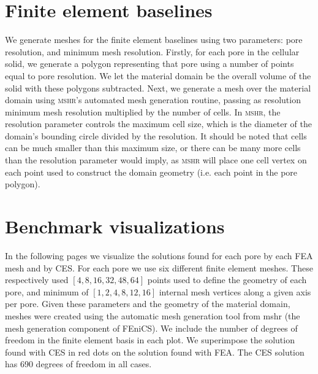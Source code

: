 \section{Finite element baselines}
We generate meshes for the finite element baselines using two parameters: pore resolution, and minimum mesh resolution.
Firstly, for each pore in the cellular solid, we generate a polygon representing that pore using a number of points equal to pore resolution.
We let the material domain be the overall volume of the solid with these polygons subtracted.
Next, we generate a mesh over the material domain using \textsc{mshr}'s automated mesh generation routine,
passing as resolution minimum mesh resolution multiplied by the number of cells.
In \textsc{mshr}, the resolution parameter controls the maximum cell size, which
is the diameter of the domain's bounding circle divided by the resolution.
It should be noted that cells can be much smaller than this maximum size, or there
can be many more cells than the resolution parameter would imply, as \textsc{mshr}
will place one cell vertex on each point used to construct the domain geometry (i.e. each point in the pore polygon).

\section{Benchmark visualizations}
In the following pages we visualize the solutions found for each pore by each FEA mesh and by CES.
For each pore we use six different finite element meshes.
These respectively used $[4, 8, 16, 32, 48, 64]$ points used to define the geometry of each pore, and minimum of $[1, 2, 4, 8, 12, 16]$ internal mesh vertices along a given axis per pore.
Given these parameters and the geometry of the material domain, meshes were created using the automatic mesh generation tool from mshr (the mesh generation component of FEniCS).
We include the number of degrees of freedom in the finite element basis in each plot.
We superimpose the solution found with CES in red dots on the solution found with FEA.
The CES solution has 690 degrees of freedom in all cases.



